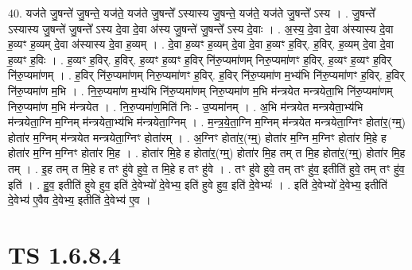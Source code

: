 \documentclass[17pt]{extarticle}
\begin{document}
40. यज॑ते जु॒षन्ते॑ जु॒षन्ते॒ यज॑ते॒ यज॑ते जु॒षन्ते᳚ ऽस्यास्य जु॒षन्ते॒ यज॑ते॒ यज॑ते जु॒षन्ते᳚ ऽस्य । . जु॒षन्ते᳚ ऽस्यास्य जु॒षन्ते॑ जु॒षन्ते᳚ ऽस्य दे॒वा दे॒वा अ॑स्य जु॒षन्ते॑ जु॒षन्ते᳚ ऽस्य दे॒वाः । . अ॒स्य॒ दे॒वा दे॒वा अ॑स्यास्य दे॒वा ह॒व्यꣳ ह॒व्यम् दे॒वा अ॑स्यास्य दे॒वा ह॒व्यम् । . दे॒वा ह॒व्यꣳ ह॒व्यम् दे॒वा दे॒वा ह॒व्यꣳ ह॒विर्. ह॒विर्. ह॒व्यम् दे॒वा दे॒वा ह॒व्यꣳ ह॒विः । . ह॒व्यꣳ ह॒विर्. ह॒विर्. ह॒व्यꣳ ह॒व्यꣳ ह॒विर् नि॑रु॒प्यमा॑णम् निरु॒प्यमा॑णꣳ ह॒विर्. ह॒व्यꣳ ह॒व्यꣳ ह॒विर् नि॑रु॒प्यमा॑णम् । . ह॒विर् नि॑रु॒प्यमा॑णम् निरु॒प्यमा॑णꣳ ह॒विर्. ह॒विर् नि॑रु॒प्यमा॑ण म॒भ्य॑भि नि॑रु॒प्यमा॑णꣳ ह॒विर्. ह॒विर् नि॑रु॒प्यमा॑ण म॒भि । . नि॒रु॒प्यमा॑ण म॒भ्य॑भि नि॑रु॒प्यमा॑णम् निरु॒प्यमा॑ण म॒भि म॑न्त्रयेत मन्त्रयेता॒भि नि॑रु॒प्यमा॑णम् निरु॒प्यमा॑ण म॒भि म॑न्त्रयेत । . नि॒रु॒प्यमा॑ण॒मिति॑ निः - उ॒प्यमा॑नम् । . अ॒भि म॑न्त्रयेत मन्त्रयेता॒भ्य॑भि म॑न्त्रयेता॒ग्नि म॒ग्निम् म॑न्त्रयेता॒भ्य॑भि म॑न्त्रयेता॒ग्निम् । . म॒न्त्र॒ये॒ता॒ग्नि म॒ग्निम् म॑न्त्रयेत मन्त्रयेता॒ग्निꣳ होता॑र॒(ग्म्॒) होता॑र म॒ग्निम् म॑न्त्रयेत मन्त्रयेता॒ग्निꣳ होता॑रम् । . अ॒ग्निꣳ होता॑र॒(ग्म्॒) होता॑र म॒ग्नि म॒ग्निꣳ होता॑र मि॒हे ह होता॑र म॒ग्नि म॒ग्निꣳ होता॑र मि॒ह । . होता॑र मि॒हे ह होता॑र॒(ग्म्॒) होता॑र मि॒ह तम् त मि॒ह होता॑र॒(ग्म्॒) होता॑र मि॒ह तम् । . इ॒ह तम् त मि॒हे ह तꣳ हु॑वे हुवे॒ त मि॒हे ह तꣳ हु॑वे । . तꣳ हु॑वे हुवे॒ तम् तꣳ हु॑व॒ इतीति॑ हुवे॒ तम् तꣳ हु॑व॒ इति॑ । . हु॒व॒ इतीति॑ हुवे हुव॒ इति॑ दे॒वेभ्यो॑ दे॒वेभ्य॒ इति॑ हुवे हुव॒ इति॑ दे॒वेभ्यः॑ । . इति॑ दे॒वेभ्यो॑ दे॒वेभ्य॒ इतीति॑ दे॒वेभ्य॑ ए॒वैव दे॒वेभ्य॒ इतीति॑ दे॒वेभ्य॑ ए॒व । \newline
\pagebreak
{}

\section{ TS 1.6.8.4 }
\end{document}
